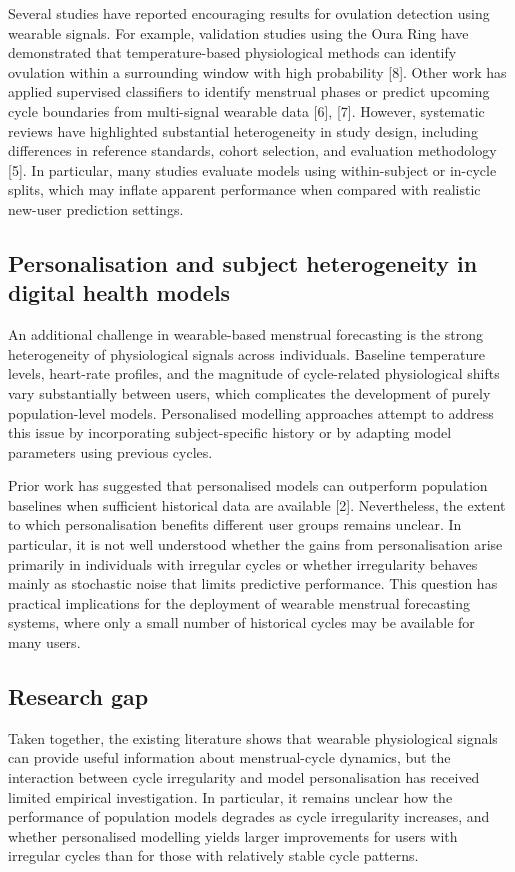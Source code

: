 \documentclass[conference]{IEEEtran}
\begin{document}
Several studies have reported encouraging results for ovulation detection using wearable signals. For example, validation studies using the Oura Ring have demonstrated that temperature-based physiological methods can identify ovulation within a surrounding window with high probability [8]. Other work has applied supervised classifiers to identify menstrual phases or predict upcoming cycle boundaries from multi-signal wearable data [6], [7]. However, systematic reviews have highlighted substantial heterogeneity in study design, including differences in reference standards, cohort selection, and evaluation methodology [5]. In particular, many studies evaluate models using within-subject or in-cycle splits, which may inflate apparent performance when compared with realistic new-user prediction settings.

\subsection{Personalisation and subject heterogeneity in digital health models}

An additional challenge in wearable-based menstrual forecasting is the strong heterogeneity of physiological signals across individuals. Baseline temperature levels, heart-rate profiles, and the magnitude of cycle-related physiological shifts vary substantially between users, which complicates the development of purely population-level models. Personalised modelling approaches attempt to address this issue by incorporating subject-specific history or by adapting model parameters using previous cycles.

Prior work has suggested that personalised models can outperform population baselines when sufficient historical data are available [2]. Nevertheless, the extent to which personalisation benefits different user groups remains unclear. In particular, it is not well understood whether the gains from personalisation arise primarily in individuals with irregular cycles or whether irregularity behaves mainly as stochastic noise that limits predictive performance. This question has practical implications for the deployment of wearable menstrual forecasting systems, where only a small number of historical cycles may be available for many users.

\subsection{Research gap}

Taken together, the existing literature shows that wearable physiological signals can provide useful information about menstrual-cycle dynamics, but the interaction between cycle irregularity and model personalisation has received limited empirical investigation. In particular, it remains unclear how the performance of population models degrades as cycle irregularity increases, and whether personalised modelling yields larger improvements for users with irregular cycles than for those with relatively stable cycle patterns.
\end{document}
